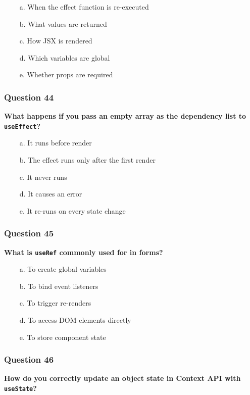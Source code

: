 \documentclass{article}
\newcommand{\cmark}{\textcolor{green}{\ding{51}}} %
\newcommand{\xmark}{\textcolor{red}{\ding{55}}}   %
\begin{document}
\begin{itemize}
  \item[\cmark\ a.] When the effect function is re-executed
  \item[\xmark\ b.] What values are returned
  \item[\xmark\ c.] How JSX is rendered
  \item[\xmark\ d.] Which variables are global
  \item[\xmark\ e.] Whether props are required
\end{itemize}

\subsubsection*{Question 44}
\textbf{What happens if you pass an empty array as the dependency list to \texttt{useEffect}?}

\begin{itemize}
  \item[\xmark\ a.] It runs before render
  \item[\cmark\ b.] The effect runs only after the first render
  \item[\xmark\ c.] It never runs
  \item[\xmark\ d.] It causes an error
  \item[\xmark\ e.] It re-runs on every state change
\end{itemize}

\subsubsection*{Question 45}
\textbf{What is \texttt{useRef} commonly used for in forms?}

\begin{itemize}
  \item[\xmark\ a.] To create global variables
  \item[\xmark\ b.] To bind event listeners
  \item[\xmark\ c.] To trigger re-renders
  \item[\cmark\ d.] To access DOM elements directly
  \item[\xmark\ e.] To store component state
\end{itemize}

\subsubsection*{Question 46}
\textbf{How do you correctly update an object state in Context API with \texttt{useState}?}
\end{document}
